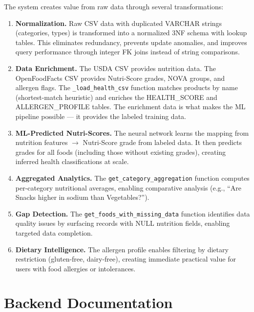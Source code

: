 \documentclass[12pt,a4paper]{article}
\begin{document}
The system creates value from raw data through several transformations:

\begin{enumerate}
    \item \textbf{Normalization.} Raw CSV data with duplicated VARCHAR strings (categories, types) is transformed into a normalized 3NF schema with lookup tables. This eliminates redundancy, prevents update anomalies, and improves query performance through integer FK joins instead of string comparisons.

    \item \textbf{Data Enrichment.} The USDA CSV provides nutrition data. The OpenFoodFacts CSV provides Nutri-Score grades, NOVA groups, and allergen flags. The \texttt{\_load\_health\_csv} function matches products by name (shortest-match heuristic) and enriches the HEALTH\_SCORE and ALLERGEN\_PROFILE tables. The enrichment data is what makes the ML pipeline possible — it provides the labeled training data.

    \item \textbf{ML-Predicted Nutri-Scores.} The neural network learns the mapping from nutrition features $\rightarrow$ Nutri-Score grade from labeled data. It then predicts grades for all foods (including those without existing grades), creating inferred health classifications at scale.

    \item \textbf{Aggregated Analytics.} The \texttt{get\_category\_aggregation} function computes per-category nutritional averages, enabling comparative analysis (e.g., ``Are Snacks higher in sodium than Vegetables?'').

    \item \textbf{Gap Detection.} The \texttt{get\_foods\_with\_missing\_data} function identifies data quality issues by surfacing records with NULL nutrition fields, enabling targeted data completion.

    \item \textbf{Dietary Intelligence.} The allergen profile enables filtering by dietary restriction (gluten-free, dairy-free), creating immediate practical value for users with food allergies or intolerances.
\end{enumerate}

\section{Backend Documentation}
\end{document}
